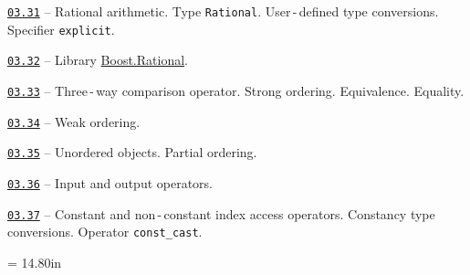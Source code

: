 \documentclass[a4paper,12pt]{article}
\renewenvironment{itemize}
{
    \begin{list}{\labelitemi}
    {
      \setlength{\topsep}{0pt}
      \setlength{\partopsep}{0pt}
      \setlength{\parskip}{0pt}
      \setlength{\itemsep}{0pt}
      \setlength{\parsep}{0pt}
      \setlength{\leftmargin}{14.5pt}
    }
}{\end{list}}
\begin{document}
\medskip\smallskip

\begin{itemize}

    \item \href{https://github.com/i-s-m-mipt/Education/blob/master/projects/examples/source/03.31.cpp}{\texttt{03.31}} -- Rational arithmetic. Type \lstinline{Rational}. User\,-\,defined type conversions. Specifier \lstinline{explicit}.

    \smallskip

    \item \href{https://github.com/i-s-m-mipt/Education/blob/master/projects/examples/source/03.32.cpp}{\texttt{03.32}} -- Library \href{https://www.boost.org/doc/libs/1_75_0/libs/rational/rational.html}{Boost.Rational}.

    \smallskip

    \item \href{https://github.com/i-s-m-mipt/Education/blob/master/projects/examples/source/03.33.cpp}{\texttt{03.33}} -- Three\,-\,way comparison operator. Strong ordering. Equivalence. Equality.

    \smallskip

    \item \href{https://github.com/i-s-m-mipt/Education/blob/master/projects/examples/source/03.34.cpp}{\texttt{03.34}} -- Weak ordering.

    \smallskip

    \item \href{https://github.com/i-s-m-mipt/Education/blob/master/projects/examples/source/03.35.cpp}{\texttt{03.35}} -- Unordered objects. Partial ordering.

    \smallskip

    \item \href{https://github.com/i-s-m-mipt/Education/blob/master/projects/examples/source/03.36.cpp}{\texttt{03.36}} -- Input and output operators.

    \smallskip

    \item \href{https://github.com/i-s-m-mipt/Education/blob/master/projects/examples/source/03.37.cpp}{\texttt{03.37}} -- Constant and non\,-\,constant index access operators. Constancy type conversions. Operator \lstinline{const_cast}.

\end{itemize}



\newpage\thispagestyle{empty}\pdfpageheight = 14.80in\enlargethispage{100in}
\end{document}
